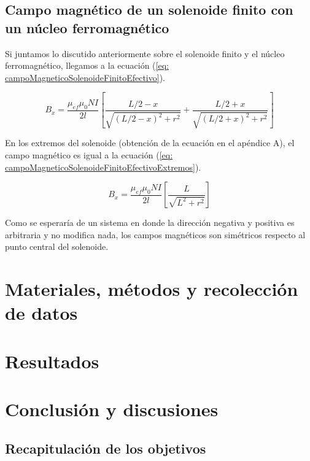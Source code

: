 \documentclass[a4paper,12pt]{article}
\begin{document}
    \subsection*{Campo magnético de un solenoide finito con un núcleo ferromagnético}

        Si juntamos lo discutido anteriormente sobre el solenoide finito y el núcleo ferromagnético, llegamos a la ecuación (\ref{eq: campoMagneticoSolenoideFinitoEfectivo}).

        \begin{equation}
            \label{eq: campoMagneticoSolenoideFinitoEfectivo}
            B_x = \frac{\mu_{ef}\mu_0 N I}{2l} \left[ \frac{L/2 - x}{\sqrt{(L/2 - x)^2 + r^2}} + \frac{L/2 + x}{\sqrt{(L/2 + x)^2 + r^2}} \right]
        \end{equation}

        En los extremos del solenoide (obtención de la ecuación en el apéndice A), el campo magnético es igual a la ecuación (\ref{eq: campoMagneticoSolenoideFinitoEfectivoExtremos}).

        \begin{equation}
            \label{eq: campoMagneticoSolenoideFinitoEfectivoExtremos}
            B_x = \frac{\mu_{ef}\mu_0 N I}{2l} \left[ \frac{L}{\sqrt{L^2 + r^2}} \right]
        \end{equation}

        Como se esperaría de un sistema en donde la dirección negativa y positiva es arbitraria y no modifica nada, los campos magnéticos son simétricos respecto al punto central del solenoide.


\section*{Materiales, métodos y recolección de datos}

    

\section*{Resultados}

    

\section*{Conclusión y discusiones}

    \subsection*{Recapitulación de los objetivos}
\end{document}
